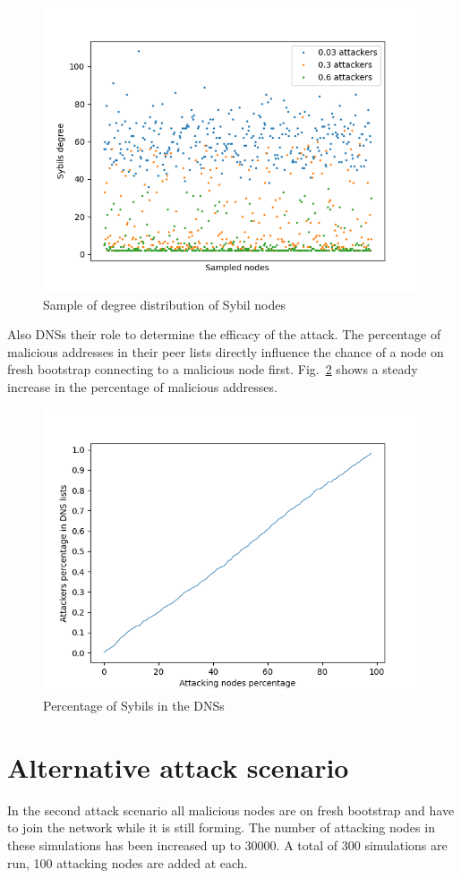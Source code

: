 \begin{figure}[h!]
	\includegraphics[width=.7\textwidth]{pict/results/in-cluster.png}
	\centering
	\caption{Sample of degree distribution of Sybil nodes}
	\label{fig:incluster}
\end{figure}

Also DNSs their role to determine the efficacy of the attack. The percentage of malicious addresses in their peer lists directly influence  the chance of a node on fresh bootstrap connecting to a malicious node first. Fig.~\ref{fig:dns} shows a steady increase in the percentage of malicious addresses.

\begin{figure}[h!]
	\includegraphics[width=.7\textwidth]{pict/results/in-dns.png}
	\centering
	\caption{Percentage of Sybils in the DNSs}
	\label{fig:dns}
\end{figure}

\section{Alternative attack scenario}\label{sec:external}
In the second attack scenario all malicious nodes are on fresh bootstrap and have to join the network while it is still forming. The number of attacking nodes in these simulations has been increased up to 30000. A total of 300 simulations are run, 100 attacking nodes are added at each.\\

